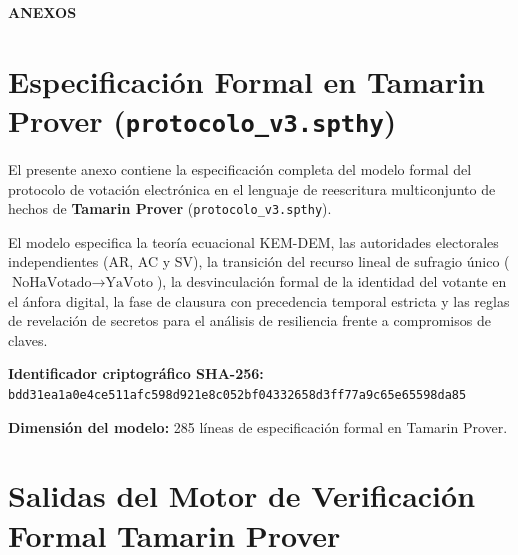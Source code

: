 \cleardoublepage
\thispagestyle{empty}
\vspace*{\fill}
\begin{center}
    {\fontsize{36}{44}\selectfont\textbf{ANEXOS}}
\end{center}
\vspace*{\fill}
\clearpage

\chapter{Especificación Formal en Tamarin Prover (\texttt{protocolo\_v3.spthy})}
\label{anexo:tamarin_spthy}

El presente anexo contiene la especificación completa del modelo formal del protocolo de votación electrónica en el lenguaje de reescritura multiconjunto de hechos de \textbf{Tamarin Prover} (\texttt{protocolo\_v3.spthy}). 

El modelo especifica la teoría ecuacional KEM-DEM, las autoridades electorales independientes (AR, AC y SV), la transición del recurso lineal de sufragio único ($\text{NoHaVotado} \to \text{YaVoto}$), la desvinculación formal de la identidad del votante en el ánfora digital, la fase de clausura con precedencia temporal estricta y las reglas de revelación de secretos para el análisis de resiliencia frente a compromisos de claves.

\begin{scriptsize}

\end{scriptsize}

\par\vspace{6pt}
\noindent\textbf{Identificador criptográfico SHA-256:}\newline
\texttt{bdd31ea1a0e4ce511afc598d921e8c052bf04332658d3ff77a9c65e65598da85}\par\vspace{2pt}
\noindent\textbf{Dimensión del modelo:} 285 líneas de especificación formal en Tamarin Prover.

\clearpage

\chapter{Salidas del Motor de Verificación Formal Tamarin Prover}
\label{anexo:tamarin_salida}


